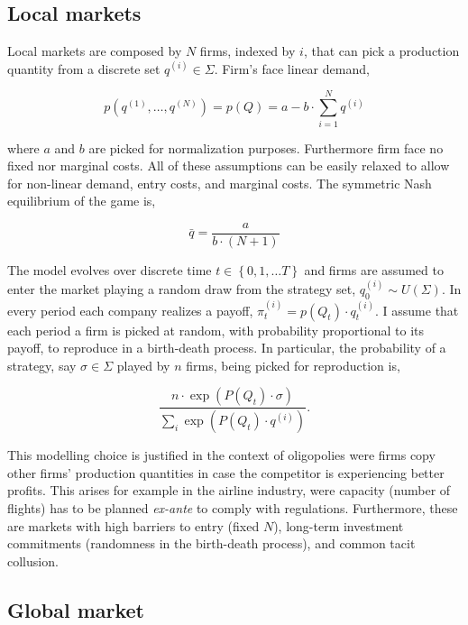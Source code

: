 \documentclass[american]{scrartcl}
\newcommand{\set}[1]{\left\{#1\right\}}
\begin{document}
\subsection{Local markets}

Local markets are composed by $N$ firms, indexed by $i$, that can pick a production quantity from a discrete set $q^{(i)} \in \Sigma$. Firm's face linear demand,

\begin{equation}
    p(q^{(1)}, \ldots, q^{(N)}) = p(Q)= a - b \cdot \sum^{N}_{i=1} q^{(i)}
\end{equation}

where $a$ and $b$ are picked for normalization purposes. Furthermore firm face no fixed nor marginal costs. All of these assumptions can be easily relaxed to allow for non-linear demand, entry costs, and marginal costs. The symmetric Nash equilibrium of the game is,

\begin{equation}
    \bar{q}= \frac{a}{b \cdot (N+1)}
\end{equation}



The model evolves over discrete time $t \in \set{0, 1, \ldots T}$ and firms are assumed to enter the market playing a random draw from the strategy set,  $q^{(i)}_0 \sim U(\Sigma)$. In every period each company realizes a payoff, $\pi^{(i)}_t = p(Q_t) \cdot q^{(i)}_t$. I assume that each period a firm is picked at random, with probability proportional to its payoff, to reproduce in a birth-death process. In particular, the probability of a strategy, say $\sigma \in \Sigma$ played by $n$ firms, being picked for reproduction is,

\begin{equation}
    \frac{n \cdot \exp(P(Q_t) \cdot \sigma)}{\sum_{i} \exp(P(Q_t) \cdot q^{(i)})}.
\end{equation}



This modelling choice is justified in the context of oligopolies were firms copy other firms' production quantities in case the competitor is experiencing better profits. This arises for example in the airline industry, were capacity (number of flights) has to be planned \textit{ex-ante} to comply with regulations. Furthermore, these are markets with high barriers to entry (fixed $N$), long-term investment commitments (randomness in the birth-death process), and common tacit collusion.

\subsection{Global market}
\end{document}
